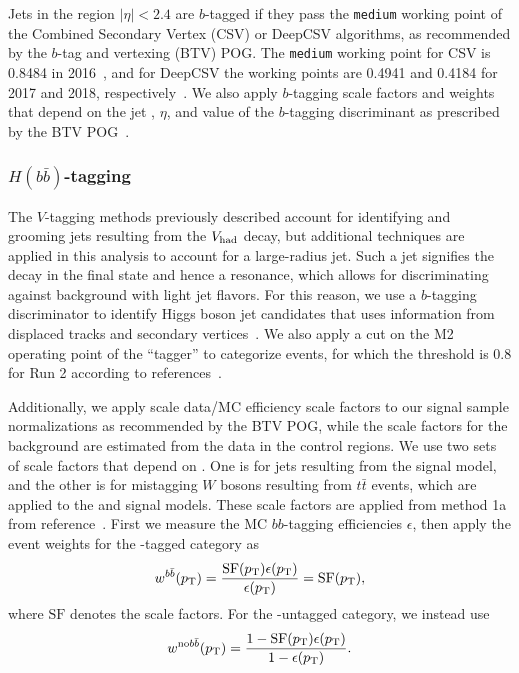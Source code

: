 Jets in the region $|\eta|<2.4$ are $b$-tagged if they pass the \texttt{medium} working point of the Combined Secondary Vertex (CSV) or DeepCSV algorithms, as recommended by the $b$-tag and vertexing (BTV) POG.
The \texttt{medium} working point for CSV is 0.8484 in 2016~\cite{bTagging2016}, and for DeepCSV the working points are 0.4941 and 0.4184 for 2017 and 2018, respectively~\cite{bTagging2017,bTagging2018}.
We also apply $b$-tagging scale factors and weights that depend on the jet \pt, $\eta$, and value of the $b$-tagging discriminant as prescribed by the BTV POG~\cite{bTaggingEff,bTaggingSF}.

\subsubsection{$H(b\bar{b})$-tagging}

The $V$-tagging methods previously described account for identifying and grooming jets resulting from the $V_\mathrm{had}$ decay, but additional techniques are applied in this analysis to account for a large-radius \bbbar jet.
Such a jet signifies the decay \Htobbbar in the final state and hence a \WH resonance, which allows for discriminating against background with light jet flavors.
For this reason, we use a $b$-tagging discriminator to identify Higgs boson jet candidates that uses information from displaced tracks and secondary vertices~\cite{CMS-PAS-BTV-15-002}.
We also apply a cut on the M2 operating point of the ``\DoubleB tagger'' to categorize events, for which the threshold is 0.8 for Run 2 according to references~\cite{bTagging2016,bTagging2017,bTagging2018}.

Additionally, we apply scale data/MC efficiency scale factors to our signal sample normalizations as recommended by the BTV POG, while the scale factors for the background are estimated from the data in the control regions.
We use two sets of scale factors that depend on \ptjet.
One is for \Htobbbar jets resulting from the \WprtoWHtolnubbbar signal model, and the other is for mistagging $W$ bosons resulting from $t\bar{t}$ events, which are applied to the \GBulktoWWtolnuqqbarpr and \WprtoWZtolnuqqbar signal models.
These scale factors are applied from method 1a from reference~\cite{bTaggingEff}.
First we measure the MC $bb$-tagging efficiencies $\epsilon$, then apply the event weights for the \bbbar-tagged category as
\begin{equation}
  w^{b\bar{b}}(p_\mathrm{T})=\frac{\mathrm{SF}(p_\mathrm{T})\epsilon(p_\mathrm{T})}{\epsilon(p_\mathrm{T})}=\mathrm{SF}(p_\mathrm{T}),
\end{equation}
where $\mathrm{SF}$ denotes the scale factors.
For the \bbbar-untagged category, we instead use
\begin{equation}
  w^{\mathrm{no}b\bar{b}}(p_\mathrm{T})=\frac{1-\mathrm{SF}(p_\mathrm{T})\epsilon(p_\mathrm{T})}{1-\epsilon(p_\mathrm{T})}.
\end{equation}

